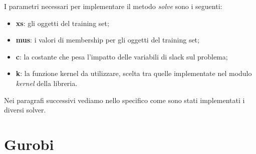 \documentclass[a4paper,12pt]{report}
\begin{document}
I parametri necessari per implementare il metodo \textit{solve} sono i seguenti: 
\begin{itemize}
    \item \textbf{xs}: gli oggetti del training set;
    \item \textbf{mus}: i valori di membership per gli oggetti del training set;
    \item \textbf{c}: la costante che pesa l'impatto delle variabili di slack sul problema;
    \item \textbf{k}: la funzione kernel da utilizzare, scelta tra quelle implementate nel modulo \textit{kernel} della libreria.
\end{itemize}

\bigskip

\noindent Nei paragrafi successivi vediamo nello specifico come sono stati implementati i diversi solver.

\section{Gurobi}



    

\end{document}
